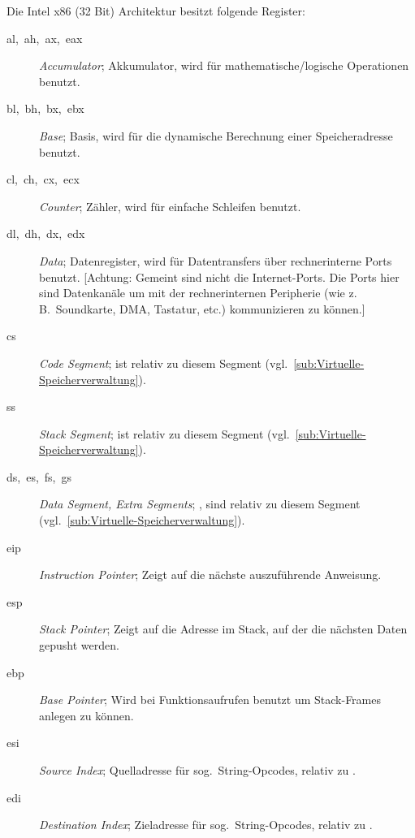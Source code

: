 Die Intel x86 (32 Bit) Architektur besitzt folgende Register:
\begin{description}
  \item [{al,~ah,~ax,~eax}] 
	\foreignlanguage{english}{\emph{Accumulator}}; Akkumulator, wird für mathematische/logische Operationen benutzt.
  \item [{bl,~bh,~bx,~ebx}]
	\foreignlanguage{english}{\emph{Base}}; Basis, wird für die dynamische Berechnung einer
	Speicheradresse benutzt.
  \item [{cl,~ch,~cx,~ecx}] 
	\foreignlanguage{english}{\emph{Counter}}; Zähler, wird für einfache Schleifen benutzt.
  \item [{dl,~dh,~dx,~edx}] 
	\foreignlanguage{english}{\emph{Data}}; Datenregister, wird für Datentransfers über rechnerinterne Ports benutzt.
	  [Achtung: Gemeint sind nicht die Internet-Ports. Die Ports hier sind Datenkanäle um mit der rechnerinternen Peripherie (wie z.\,B.~Soundkarte, DMA, Tastatur, etc.) kommunizieren zu können.]
  \item [{cs}] 
	\foreignlanguage{english}{\emph{Code Segment}};  ist relativ zu diesem Segment (vgl.~\cref{sub:Virtuelle-Speicherverwaltung}).
  \item [{ss}]
      \foreignlanguage{english}{\emph{Stack Segment}};  ist relativ zu diesem Segment (vgl.~\cref{sub:Virtuelle-Speicherverwaltung}).
  \item [{ds,~es,~fs,~gs}]
	\foreignlanguage{english}{\emph{Data Segment, Extra Segments}}; ,  sind relativ zu diesem Segment (vgl.~\cref{sub:Virtuelle-Speicherverwaltung}).
  \item [{eip}]
	\foreignlanguage{english}{\emph{Instruction Pointer}}; Zeigt auf die nächste auszuführende Anweisung.
  \item [{esp}] 
	\foreignlanguage{english}{\emph{Stack Pointer}}; Zeigt auf die Adresse im Stack, auf der die nächsten Daten gepusht werden.
  \item [{ebp}] 
	\foreignlanguage{english}{\emph{Base Pointer}}; Wird bei Funktionsaufrufen benutzt um Stack-Frames anlegen zu können.
  \item [{esi}] 
	\foreignlanguage{english}{\emph{Source Index}}; Quelladresse für sog.~String-Opcodes,
	relativ zu .
  \item [{edi}] 
	\foreignlanguage{english}{\emph{Destination Index}}; Zieladresse für sog.~String-Opcodes, relativ zu .
\end{description}
